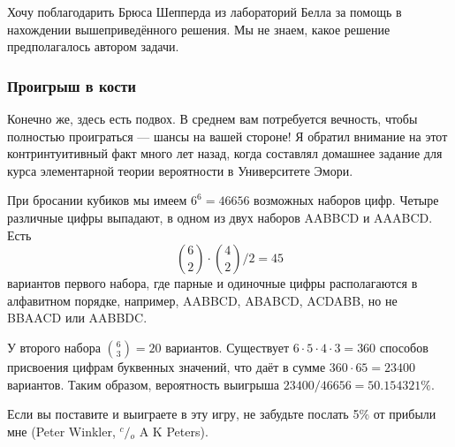 Хочу поблагодарить Брюса Шепперда %
из лабораторий Белла %
за помощь в нахождении вышеприведённого решения.
Мы не знаем, какое решение предполагалось автором задачи.

\subsubsection*{Проигрыш в кости}%

Конечно же, здесь есть подвох.
В среднем вам потребуется вечность, чтобы полностью проиграться --- шансы на вашей стороне! 
Я обратил внимание на этот контринтуитивный факт много лет назад, когда составлял домашнее задание для курса элементарной теории вероятности в Университете Эмори.

При бросании кубиков мы имеем $6^6 =46656$ возможных наборов цифр.
Четыре различные цифры выпадают, в одном из двух наборов AABBCD и AAABCD.
Есть
\[\binom62\cdot\binom42/2=45\]
вариантов первого набора, где парные и одиночные цифры располагаются в алфавитном порядке, например, AABBCD, ABABCD, ACDABB, но не BBAACD или AABBDC.

У второго набора $\binom63=20$  вариантов.
Существует $6\cdot 5\cdot 4\cdot 3=360$ способов присвоения цифрам буквенных значений, что даёт в сумме $360\cdot 65=23400$ вариантов.
Таким образом, вероятность выигрыша
$23400/46656 = 50.154321\%$.
\heart

Если вы поставите и выиграете в эту игру, не забудьте послать 5\% от прибыли мне 
(Peter Winkler, ${^c\!/\!_o}$ A  K Peters).
